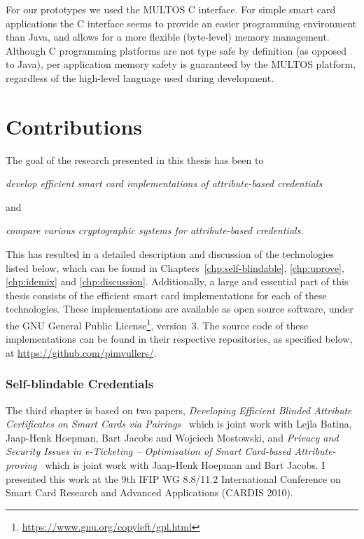 For our prototypes we used the MULTOS C interface. For simple smart card
applications the C interface seems to provide an easier programming environment
than Java, and allows for a more flexible (byte-level) memory management.
Although C programming platforms are not type safe by definition (as opposed to
Java), per application memory safety is guaranteed by the MULTOS platform,
regardless of the high-level language used during development.


\section{Contributions}

The goal of the research presented in this thesis has been to
\begin{center}\it
  develop efficient smart card implementations of attribute-based credentials
\end{center}
and
\begin{center}\it
  compare various cryptographic systems for attribute-based credentials.
\end{center}
This has resulted in a detailed description and discussion of the technologies
listed below, which can be found in Chapters~\ref{chp:self-blindable},
\ref{chp:uprove}, \ref{chp:idemix} and \ref{chp:discussion}. Additionally, a
large and essential part of this thesis consists of the efficient smart card
implementations for each of these technologies. These implementations are
available as open source software, under the GNU General Public
License\footnote{\url{https://www.gnu.org/copyleft/gpl.html}}, version~3. The
source code of these implementations can be found in their respective
repositories, as specified below, at \url{https://github.com/pimvullers/}.

\subsubsection{Self-blindable Credentials}

The third chapter is based on two papers, \emph{Developing Efficient Blinded
Attribute Certificates on Smart Cards via Pairings}~\cite{BatinaHJMV10} which
is joint work with Lejla Batina, Jaap-Henk Hoepman, Bart Jacobs and Wojciech
Mostowski, and \emph{Privacy and Security Issues in e-Ticketing -- Optimisation
of Smart Card-based Attribute-proving}~\cite{HoepmanJV10} which is joint work
with Jaap-Henk Hoepman and Bart Jacobs. I presented this work at the 9th IFIP WG
8.8/11.2 International Conference on Smart Card Research and Advanced
Applications (CARDIS 2010).


